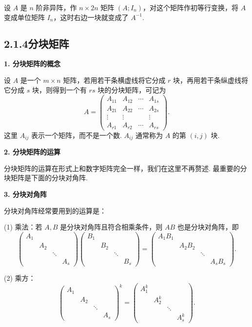 \documentclass[UTF8,12pt,a4paper,fontset=fandol]{ctexart}
\begin{document}
设 $A$ 是 $n$ 阶非异阵，作 $n\times 2n$ 矩阵 $(A;I_n)$，对这个矩阵作初等行变换，将 $A$ 变成单位矩阵 $I_n$，这时右边一块就变成了 $A^{-1}$.

\subsection*{2.1.4\quad 分块矩阵}

\noindent\textbf{1. 分块矩阵的概念}

设 $A$ 是一个 $m\times n$ 矩阵，若用若干条横虚线将它分成 $r$ 块，再用若干条纵虚线将它分成 $s$ 块，则得到一个有 $rs$ 块的分块矩阵，可记为
\[
A=
\left(
\begin{array}{cccc}
A_{11} & A_{12} & \cdots & A_{1s}\\
A_{21} & A_{22} & \cdots & A_{2s}\\
\vdots & \vdots & & \vdots\\
A_{r1} & A_{r2} & \cdots & A_{rs}
\end{array}
\right).
\]
这里 $A_{ij}$ 表示一个矩阵，而不是一个数. $A_{ij}$ 通常称为 $A$ 的第 $(i,j)$ 块.

\noindent\textbf{2. 分块矩阵的运算}

分块矩阵的运算在形式上和数字矩阵完全一样，我们在这里不再赘述. 最重要的分块矩阵是下面的分块对角阵.

\noindent\textbf{3. 分块对角阵}

分块对角阵经常要用到的运算是：

(1) 乘法：若 $A,B$ 是分块对角阵且符合相乘条件，则 $AB$ 也是分块对角阵，即
\[
\left(
\begin{array}{cccc}
A_1 & & &\\
& A_2 & &\\
& & \ddots &\\
& & & A_s
\end{array}
\right)
\left(
\begin{array}{cccc}
B_1 & & &\\
& B_2 & &\\
& & \ddots &\\
& & & B_s
\end{array}
\right)
=
\left(
\begin{array}{cccc}
A_1B_1 & & &\\
& A_2B_2 & &\\
& & \ddots &\\
& & & A_sB_s
\end{array}
\right).
\]

(2) 乘方：
\[
\left(
\begin{array}{cccc}
A_1 & & &\\
& A_2 & &\\
& & \ddots &\\
& & & A_s
\end{array}
\right)^k
=
\left(
\begin{array}{cccc}
A_1^k & & &\\
& A_2^k & &\\
& & \ddots &\\
& & & A_s^k
\end{array}
\right).
\]
\end{document}
